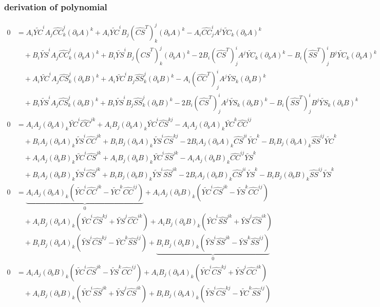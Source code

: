 \documentclass[notitlepage]{article}
\newcommand{\YC}[1][n]{\widetilde{YC}}
\newcommand{\YS}[1][n]{\widetilde{YS}}
\newcommand{\hatCS}[1][nm]{\widehat{CS}}
\newcommand{\hatCC}[1][nm]{\widehat{CC}}
\newcommand{\hatSS}[1][nm]{\widehat{SS}}
\newcommand{\dA}{(\partial_b A)}
\newcommand{\dB}{(\partial_b B)}
\begin{document}
\subsubsection{derivation of polynomial}

\begin{align*}
0 &= A_i\YC^iA_j\hatCC^j_k\dA^k + A_i\YC^iB_j(\hatCS^T)^j_k\dA^k - A_i\hatCC^i_j A^j\YC_k\dA^k\\
  &\quad + B_i\YS^iA_j\hatCC^j_k\dA^k + B_i\YS^iB_j(\hatCS^T)^j_k\dA^k - 2B_i(\hatCS^T)^i_jA^j\YC_k\dA^k - B_i(\hatSS^T)^i_jB^j\YC_k\dA^k\\
  &\quad + A_i\YC^iA_j\hatCS^j_k\dB^k + A_i\YC^iB_j\hatSS^j_k\dB^k - A_i(\hatCC^T)^i_j A^j\YS_k\dB^k\\
  &\quad + B_i\YS^iA_j\hatCS^j_k\dB^k + B_i\YS^iB_j\hatSS^j_k\dB^k - 2B_i(\hatCS^T)^i_jA^j\YS_k\dB^k - B_i(\hatSS^T)^i_jB^j\YS_k\dB^k\\
0 &= A_iA_j\dA_k\YC^i\hatCC^{jk} + A_iB_j\dA_k\YC^i\hatCS^{kj} - A_iA_j\dA_k\YC^k\hatCC^{ij}\\
  &\quad + B_iA_j\dA_k\YS^i\hatCC^{jk} + B_iB_j\dA_k\YS^i\hatCS^{kj} - 2B_iA_j\dA_k\hatCS^{ji}\YC^k - B_iB_j\dA_k\hatSS^{ij}\YC^k\\
  &\quad + A_iA_j\dB_k\YC^i\hatCS^{jk} + A_iB_j\dB_k\YC^i\hatSS^{jk} - A_iA_j\dB_k\hatCC^{ij}\YS^k\\
  &\quad + B_iA_j\dB_k\YS^i\hatCS^{jk} + B_iB_j\dB_k\YS^i\hatSS^{jk} - 2B_iA_j\dB_k\hatCS^{ji}\YS^k - B_iB_j\dB_k\hatSS^{ij}\YS^k\\
0 &= \underbrace{A_iA_j\dA_k\left(\YC^i\hatCC^{jk} -  \YC^k\hatCC^{ij}\right)}_{0} + A_iA_j\dB_k\left(\YC^i\hatCS^{jk} - \YS^k\hatCC^{ij}\right)\\
  &\quad + A_iB_j\dA_k\left(\YC^i\hatCS^{kj} + \YS^j\hatCC^{ik}\right) + A_iB_j\dB_k\left( \YC^i\hatSS^{jk} + \YS^j\hatCS^{ik}\right)\\
  &\quad + B_iB_j\dA_k\left(\YS^i\hatCS^{kj} - \YC^k\hatSS^{ij}\right) + \underbrace{B_iB_j\dB_k\left(\YS^i\hatSS^{jk} - \YS^k\hatSS^{ij}\right)}_{0}\\
0 &= A_iA_j\dB_k\left(\YC^i\hatCS^{jk} - \YS^k\hatCC^{ij}\right) + A_iB_j\dA_k\left(\YC^i\hatCS^{kj} + \YS^j\hatCC^{ik}\right)\\
  &\quad + A_iB_j\dB_k\left( \YC^i\hatSS^{jk} + \YS^j\hatCS^{ik}\right) + B_iB_j\dA_k\left(\YS^i\hatCS^{kj} - \YC^k\hatSS^{ij}\right)
\end{align*}
\end{document}
